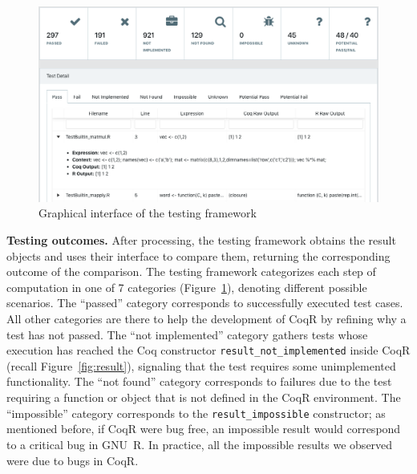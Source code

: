 \documentclass[
    sigplan,
    10pt,
    review, %
    natbib=false %
 ]{acmart}
\newcommand\td[1]{\todo[color=green!20,size=\scriptsize]{#1}}
\newcommand\CoqR{CoqR}
\begin{document}
\begin{figure}
    \includegraphics[width=.5\textwidth]{framework.png}
\vspace{-1em}
    \caption{Graphical interface of the testing framework}
    \label{fig:testing:interface}
\end{figure}
\noindent\textbf{Testing outcomes.}
After processing, the testing framework obtains the result objects and uses their interface to compare them, returning the corresponding outcome of the comparison.
The testing framework categorizes each step of computation
in one of 7 categories (Figure~\ref{fig:testing:interface}), denoting different possible scenarios. The ``passed'' category corresponds to successfully executed test cases. All other categories are there to help the development of \CoqR{} by refining why a test has not passed. The ``not implemented'' category gathers tests whose execution has reached the Coq constructor \texttt{result_not_implemented} inside \CoqR{} (recall Figure~\ref{fig:result}), signaling that the test requires some unimplemented functionality. The ``not found'' category corresponds to failures due to the test requiring a function or object that is not defined in the \CoqR{} environment. The ``impossible'' category corresponds to the \texttt{result_impossible} constructor; as mentioned before, if \CoqR{} were bug free, an impossible result would correspond to a critical bug in GNU~R. In practice, all the impossible results we observed were due to bugs in \CoqR{}.

\end{document}
